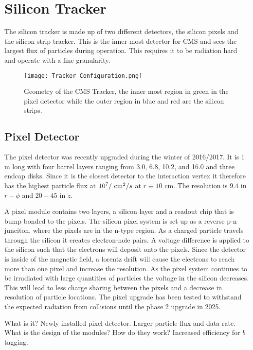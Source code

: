\section{Silicon Tracker}
\label{sec:Tracker}

The silicon tracker is made up of two different detectors, the silicon pixels and the silicon strip tracker. This is the inner most detector for CMS and sees the largest flux of particles during operation. This requires it to be radiation hard and operate with a fine granularity. 

\begin{figure}
 	\centering
	\texttt{[image: Tracker\_Configuration.png]}
 	\caption{Geometry of the CMS Tracker, the inner most region in green in the pixel detector while the outer region in blue and red are the silicon strips.}
 	\label{CMSSlice} 
\end{figure}

\subsection{Pixel Detector}
\label{subsec:Pixel}

The pixel detector was recently upgraded during the winter of 2016/2017. It is 1 m long with four barrel layers ranging from 3.0, 6.8, 10.2, and 16.0 \cm and three endcap disks. Since it is the closest detector to the interaction vertex it therefore has the highest particle flux at $10^7/\text{ cm}^2/s$ at $r\equiv10$ cm. The resolution is $9.4$ \mum in $r-\phi$ and $20-45$ \mum in $z$.

A pixel module contains two layers, a silicon layer and a readout chip that is bump bonded to the pixels. The silicon pixel system is set up as a reverse p-n junciton, where the pixels are in the n-type region. As a charged particle travels through the silicon it creates electron-hole pairs. A voltage difference is applied to the silicon such that the electrons will deposit onto the pixels. Since the detector is inside of the magnetic field, a lorentz drift will cause the electrons to reach more than one pixel and increase the resolution. As the pixel system continues to be irradiated with large quantities of particles the voltage in the silicon decreases. This will lead to less charge sharing between the pixels and a decrease in resolution of particle locations. The pixel upgrade has been tested to withstand the expected radiation from collisions until the phase 2 upgrade in 2025. 

What is it?
Newly installed pixel detector. Larger particle flux and data rate. What is the design of the modules? How do they work?
Increased efficiency for $b$ tagging.

